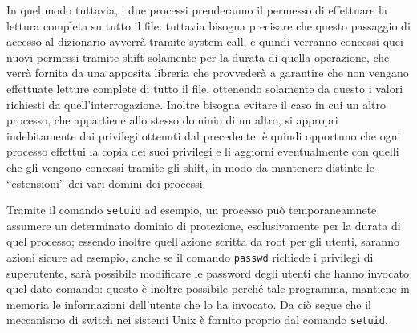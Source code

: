 In quel modo tuttavia, i due processi prenderanno il permesso di effettuare 
la lettura completa su tutto il file: tuttavia bisogna precisare che questo
passaggio di accesso al dizionario avverrà tramite system call, e quindi verranno
concessi quei nuovi permessi tramite shift solamente per la durata di quella 
operazione, che verrà fornita da una apposita libreria che provvederà a garantire
che non vengano effettuate letture complete di tutto il file, ottenendo solamente
da questo i valori richiesti da quell'interrogazione. Inoltre bisogna evitare il
caso in cui un altro processo, che appartiene allo stesso dominio di un altro,
si appropri indebitamente dai privilegi ottenuti dal precedente: è quindi opportuno
che ogni processo effettui la copia dei suoi privilegi e li aggiorni eventualmente
con quelli che gli vengono concessi tramite gli shift, in modo da mantenere 
distinte le ``estensioni'' dei vari domini dei processi.


Tramite il comando \texttt{setuid} ad esempio, un processo può temporaneamnete 
assumere un determinato dominio di protezione, esclusivamente per la durata
di quel processo; essendo inoltre quell'azione scritta da root per gli utenti,
saranno azioni sicure ad esempio, anche se il comando \texttt{passwd} richiede i 
privilegi di superutente, sarà possibile modificare le password degli utenti
che hanno invocato quel dato comando: questo è inoltre possibile perché tale
programma, mantiene in memoria le informazioni dell'utente che lo ha invocato.
Da ciò segue che il meccanismo di switch nei sistemi Unix è fornito proprio dal
comando \texttt{setuid}.

